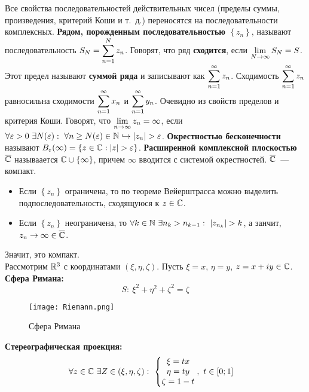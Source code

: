 \corollary
Все свойства последовательностей действительных чисел (пределы суммы,
произведения, критерий Коши и т.~д.) переносятся на последовательности
комплексных.
\Def
\textbf{Рядом, порожденным последовательностью $\left\{ z_n \right\}$}, называют
последовательность $S_N = \displaystyle \sum_{n=1}^Nz_n$. Говорят, что ряд
\textbf{сходится}, если $\displaystyle \lim_{N \to \infty}S_N = S$. Этот предел называют
\textbf{суммой ряда} и записывают как $\displaystyle \sum_{n=1}^\infty z_n$.
\asm
Сходимость $\displaystyle \sum_{n=1}^\infty z_n$ равносильна сходимости $\displaystyle
\sum_{n=1}^\infty x_n$ и $\displaystyle \sum_{n=1}^\infty y_n$.
\pr
Очевидно из свойств пределов и критерия Коши.
\Def
Говорят, что $\displaystyle \lim_{n\to \infty}z_n = \infty$, если $\forall \varepsilon >
0 \ \exists N(\varepsilon): \ \forall n \geq N(\varepsilon)\in \NN \hookrightarrow
\left| z_n \right|> \varepsilon$. \textbf{Окрестностью бесконечности} называют
$B_\varepsilon(\infty) = \left\{ z \in \mathbb{C}: \left| z \right| > \varepsilon
\right\}$.
\Def
\textbf{Расширенной комплексной плоскостью} $\overline{\mathbb{C}}$ называается $\mathbb{C} \cup \left\{
    \infty \right\}$, причем $\infty$ вводится с системой окрестностей.
\Note
$\overline{\mathbb{C}}$~--- компакт.
\pr ~
\begin{itemize}
    \item Если $\left\{ z_n \right\}$ ограничена, то по теореме Вейерштрасса
    можно выделить подпоследовательность, сходящуюся к $z \in \mathbb{C}$.
    \item Если $\left\{ z_n \right\}$ неограничена, то $\forall k \in \mathbb{N}
    \ \exists n_k > n_{k-1}: \ \left| z_{n_k} \right| > k$, а занчит, $z_n \to
    \infty \in \overline{\mathbb{C}}$.
\end{itemize}
Значит, это компакт.
\\
Рассмотрим $\mathbb{R}^3$ с координатами $(\xi, \eta, \zeta)$. Пусть $\xi = x$, $\eta =
y$, $z = x+iy \in \mathbb{C}$.
\Def
\textbf{Сфера Римана:}
\begin{equation}\label{(2.2)}
    S: \ \xi^2+\eta^2+\zeta^2 = \zeta
\end{equation}
\begin{figure}[h!]
		\centering
		\texttt{[image: Riemann.png]}
    \caption{Сфера Римана}
		\label{fig:2.1}
\end{figure}
\Def
\textbf{Стереографическая проекция:}
\begin{align*}
  & \forall z \in \mathbb{C} \ \exists Z \in (\xi, \eta, \zeta): \ \left\{ \begin{matrix}
          \xi = tx \\
          \eta = ty \\
          \zeta = 1-t
      \end{matrix} \right., \ t \in [0;1]
\end{align*}
